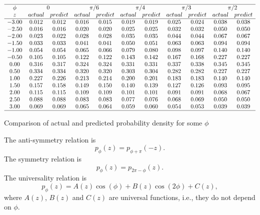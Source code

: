 \documentclass[twoside]{article}
\begin{document}
\begin{table}
\centering \(\begin{array}{ccccccccccc}

\hline
\phi  &  \multicolumn{2}{c}  {0 }   &    \multicolumn{2}{c}  {\pi/6}&  \multicolumn{2}{c}  { \pi/4}   &    \multicolumn{2}{c}  {\pi/3}&  \multicolumn{2}{c}  {\pi/2 } \\
z&actual&predict&actual&predict &actual&predict &actual&predict &actual&predict\\
\hline
  -3.00&  0.012&  0.012&  0.016&  0.015&  0.019&  0.019&  0.025&  0.024&  0.038&  0.038 \\
  -2.50&  0.016&  0.016&  0.020&  0.020&  0.025&  0.025&  0.032&  0.032&  0.050&  0.050 \\
  -2.00&  0.023&  0.022&  0.028&  0.028&  0.035&  0.035&  0.044&  0.044&  0.067&  0.067 \\
  -1.50&  0.033&  0.033&  0.041&  0.041&  0.050&  0.051&  0.063&  0.063&  0.094&  0.094 \\
  -1.00&  0.054&  0.054&  0.065&  0.066&  0.079&  0.080&  0.098&  0.097&  0.140&  0.140 \\
  -0.50&  0.105&  0.105&  0.122&  0.122&  0.143&  0.142&  0.167&  0.168&  0.227&  0.227 \\
   0.00&  0.316&  0.317&  0.324&  0.324&  0.331&  0.331&  0.337&  0.338&  0.345&  0.345 \\
   0.50&  0.334&  0.334&  0.320&  0.320&  0.303&  0.304&  0.282&  0.282&  0.227&  0.227 \\
   1.00&  0.227&  0.226&  0.213&  0.214&  0.200&  0.201&  0.183&  0.183&  0.140&  0.140 \\
   1.50&  0.157&  0.158&  0.149&  0.150&  0.140&  0.139&  0.127&  0.126&  0.093&  0.095 \\
   2.00&  0.115&  0.115&  0.109&  0.109&  0.101&  0.101&  0.091&  0.091&  0.068&  0.067 \\
   2.50&  0.088&  0.088&  0.083&  0.083&  0.077&  0.076&  0.068&  0.069&  0.050&  0.050 \\
   3.00&  0.069&  0.069&  0.065&  0.064&  0.059&  0.060&  0.054&  0.053&  0.039&  0.039 \\
\hline
\end{array}\)
\caption{Comparison of actual and predicted probability density for some $\phi$   }
\label{tab:pred}
\end{table}



The anti-symmetry relation is
\begin{equation}
p_{\phi}(z) = p_{\phi+\pi}(-z).
\label{eq:antisym}
\end{equation}
The symmetry relation is
\begin{equation}
p_{\phi}(z) = p_{2\pi-\phi}(z).
\label{eq:sym}
\end{equation}
The universality relation is
\begin{equation}
p_{\phi}(z) = A(z)\cos(\phi) + B(z)\cos(2\phi) +C(z),
\label{eq:universality}
\end{equation}
where $A(z)$, $B(z)$ and $C(z)$ are universal functions, i.e., they do not depend on $\phi$. 
\end{document}
